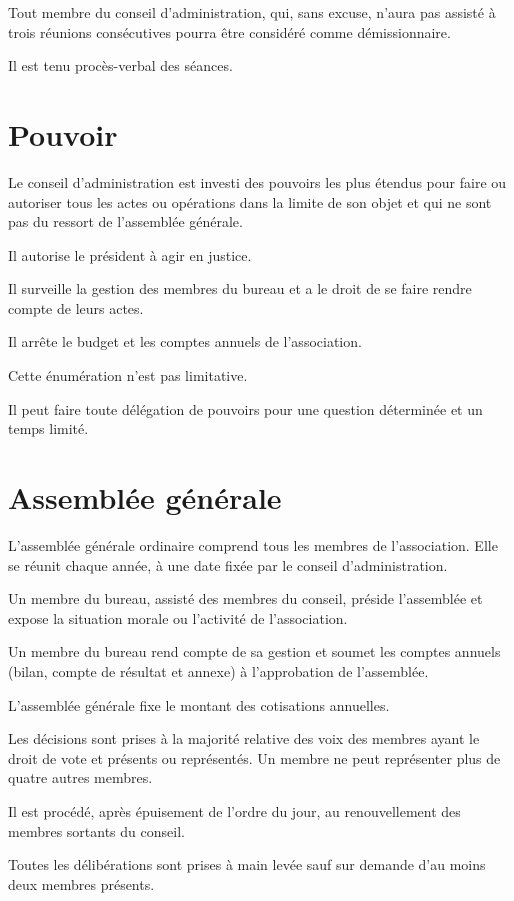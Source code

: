 \documentclass[12 pt]{article}
\begin{document}
Tout membre du conseil d'administration, qui, sans excuse, n'aura pas
assisté à trois réunions consécutives pourra être considéré comme
démissionnaire.

Il est tenu procès-verbal des séances.

\section{Pouvoir}
\label{sec:pouvoir}

Le conseil d'administration est investi des pouvoirs les plus étendus
pour faire ou autoriser tous les actes ou opérations dans la limite de
son objet et qui ne sont pas du ressort de l'assemblée générale.

Il autorise le président à agir en justice.

Il surveille la gestion des membres du bureau et a le droit de se
faire rendre compte de leurs actes.

Il arrête le budget et les comptes annuels de l'association.

Cette énumération n'est pas limitative.

Il peut faire toute délégation de pouvoirs pour une question
déterminée et un temps limité.

\section{Assemblée générale}
\label{sec:assemblee-generale}


L’assemblée générale ordinaire comprend tous les membres de
l’association. Elle se réunit chaque année, à une date fixée par le
conseil d’administration.

Un membre du bureau, assisté des
membres du conseil, préside l’assemblée et expose la situation morale
ou l’activité de l’association.

Un membre du bureau rend compte de
sa gestion et soumet les comptes annuels (bilan, compte de résultat et
annexe) à l’approbation de l’assemblée.

L’assemblée générale fixe le montant des cotisations annuelles.

Les décisions sont prises à la majorité relative des voix des membres
ayant le droit de vote et présents ou représentés. Un membre ne peut
représenter plus de quatre autres membres.

Il est procédé, après épuisement de l’ordre du jour, au renouvellement
des membres sortants du conseil.

Toutes les délibérations sont prises à main levée sauf sur demande
d’au moins deux membres présents.
\end{document}

